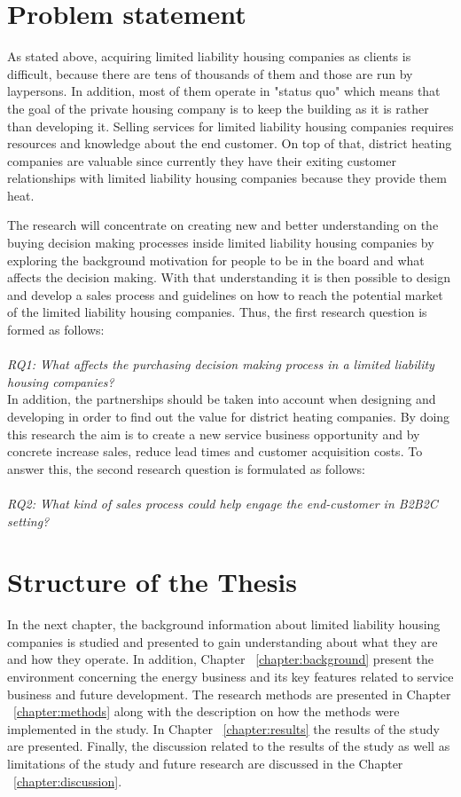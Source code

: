 \section{Problem statement}

As stated above, acquiring limited liability housing companies as clients is difficult, because there are tens of thousands of them and those are run by laypersons. In addition, most of them operate in "status quo" which means that the goal of the private housing company is to keep the building as it is rather than developing it. Selling services for limited liability housing companies requires resources and knowledge about the end customer. On top of that, district heating companies are valuable since currently they have their exiting customer relationships with limited liability housing companies because they provide them heat.

The research will concentrate on creating new and better understanding on the buying decision making processes inside limited liability housing companies by exploring the background motivation for people to be in the board and what affects the decision making. With that understanding it is then possible to design and develop a sales process and guidelines on how to reach the potential market of the limited liability housing companies. Thus, the first research question is formed as follows:\\\\
\emph{RQ1: What affects the purchasing decision making process in a limited liability housing companies?}\\

In addition, the partnerships should be taken into account when designing and developing in order to find out the value for district heating companies. By doing this research the aim is to create a new service business opportunity and by concrete increase sales, reduce lead times and customer acquisition costs. To answer this, the second research question is formulated as follows:\\\\
\emph{RQ2: What kind of sales process could help engage the end-customer in B2B2C setting?}\\

\section{Structure of the Thesis}
\label{section:structure} 

In the next chapter, the background information about limited liability housing companies is studied and presented to gain understanding about what they are and how they operate. In addition, Chapter ~\ref{chapter:background} present the environment concerning the energy business and its key features related to service business and future development. The research methods are presented in Chapter ~\ref{chapter:methods} along with the description on how the methods were implemented in the study. In Chapter ~\ref{chapter:results} the results of the study are presented. Finally, the discussion related to the results of the study as well as limitations of the study and future research are discussed in the Chapter ~\ref{chapter:discussion}.